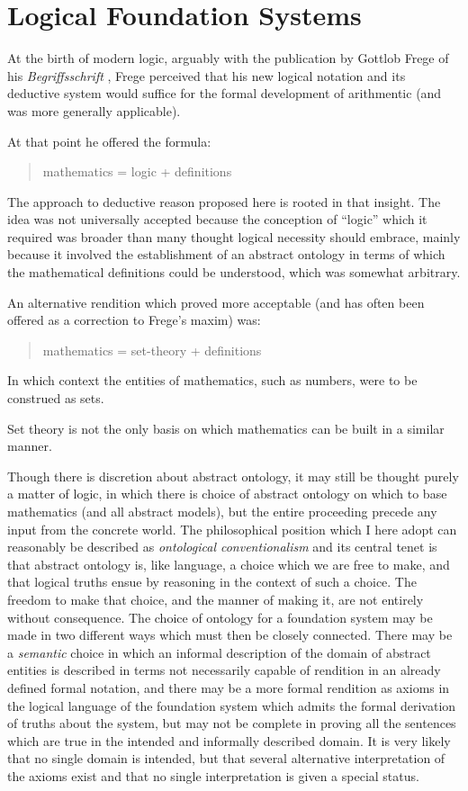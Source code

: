 \documentclass[10pt,titlepage]{book}
\begin{document}
\section{Logical Foundation Systems}

At the birth of modern logic, arguably with the publication by Gottlob Frege of his \emph{Begriffsschrift} \cite{frege1879}, Frege perceived that his new logical notation and its deductive system would suffice for the formal development of arithmentic (and was more generally applicable).

At that point he offered the formula:

\begin{quote}
  mathematics = logic + definitions
\end{quote}

The approach to deductive reason proposed here is rooted in that insight.
The idea was not universally accepted because the conception of ``logic'' which it required was broader than many thought logical necessity should embrace, mainly because it involved the establishment of an abstract ontology in terms of which the mathematical definitions could be understood, which was somewhat arbitrary.

An alternative rendition which proved more acceptable (and has often been offered as a correction to Frege's maxim) was:

\begin{quote}
  mathematics = set-theory + definitions
\end{quote}

In which context the entities of mathematics, such as numbers, were to be construed as sets.

Set theory is not the only basis on which mathematics can be built in a similar manner.

Though there is discretion about abstract ontology, it may still be thought purely a matter of logic, in which there is choice of abstract ontology on which to base mathematics (and all abstract models), but the entire proceeding precede any input from the concrete world.
The philosophical position which I here adopt can reasonably be described as \emph{ontological conventionalism} and its central tenet is that abstract ontology is, like language, a choice which we are free to make, and that logical truths ensue by reasoning in the context of such a choice.
The freedom to make that choice, and the manner of making it, are not entirely without consequence.
The choice of ontology for a foundation system may be made in two different ways which must then be closely connected.
There may be a \emph{semantic} choice in which an informal description of the domain of abstract entities is described in terms not necessarily capable of rendition in an already defined formal notation, and there may be a more formal rendition as axioms in the logical language of the foundation system which admits the formal derivation of truths about the system, but may not be complete in proving all the sentences which are true in the intended and informally described domain.
It is very likely that no single domain is intended, but that several alternative interpretation of the axioms exist and that no single interpretation is given a special status.
\end{document}
